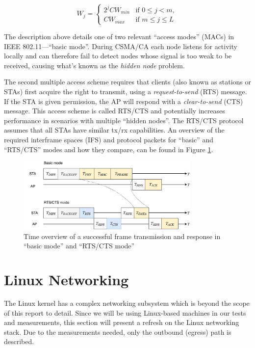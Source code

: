 \begin{equation} \label{eq:cwj}
W_j = \left\{
    \begin{array}{ll}
        2^j \mathit{CW}_{min}  & \mbox{if } 0 \leq j < m, \\
        \mathit{CW}_{max}      & \mbox{if } m \leq j \leq L
    \end{array}
\right.
\end{equation}

The description above details one of two relevant ``access modes'' (MACs) in
IEEE 802.11—``basic mode''. During CSMA/CA each node listens for activity
locally and can therefore fail to detect nodes whose signal is too weak to be
received, causing what's known as the \emph{hidden node} problem.

The second multiple access scheme requires that clients (also known as
stations or STAs) first acquire the right to transmit, using a \emph
{request-to-send} (RTS) message. If the STA is given permission, the AP will
respond with a \emph{clear-to-send} (CTS) message. This access scheme is
called RTS/CTS and potentially increases performance in scenarios with
multiple ``hidden nodes''. The RTS/CTS protocol assumes that all STAs  have
similar tx/rx capabilities. An overview of the required interframe spaces
(IFS) and protocol packets for ``basic'' and ``RTS/CTS'' modes and how they
compare, can be found in Figure \ref{fig:timings}.

\begin{figure}
\center
\includegraphics[width=0.8\textwidth]{images/time-overview.pdf}
\caption{Time overview of a successful frame transmission and response in ``basic mode'' and ``RTS/CTS mode''}
\label{fig:timings}
\end{figure}


\section{Linux Networking}

The Linux kernel has a complex networking subsystem which is beyond the scope
of this report to detail. Since we will be using Linux-based machines in our
tests and measurements, this section will present a refresh on the Linux
networking stack. Due to the measurements needed, only the outbound (egress)
path is described.

